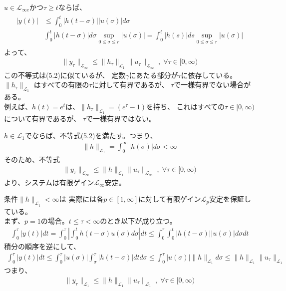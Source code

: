 \documentclass{jsarticle}
\begin{document}
$u\in \mathcal L_{\infty e}$かつ$\tau\geq t$ならば、
\begin{align}
  \begin{aligned}
    |y(t)| & \leq \int^t_0 |h(t-\sigma)||u(\sigma)|d\sigma\\
    & \int^t_0 |h(t-\sigma)|d\sigma \sup_{0\leq \sigma \leq r} |u(\sigma)| = \int^t_0 |h(s)|ds \sup_{0\leq \sigma \leq r} |u(\sigma)|
  \end{aligned}
\end{align}
よって、
\begin{align}
  \|y_\tau\|_{\mathcal L_\infty}\leq \|h_\tau\|_{\mathcal L_1}\|u_\tau\|_{\mathcal L_\infty}\;,\;\forall \tau \in [0,\infty)
\end{align}
この不等式は(5.2)に似ているが、
定数$\gamma$にあたる部分が$\tau$に依存している。\\
$\|h_\tau\|_{\mathcal L_1}$ はすべての有限の$\tau$に対して有界であるが、
$\tau$で一様有界でない場合がある。\\
例えば、$h(t)=e^t$は、$\|h_\tau\|_{\mathcal L_1}=(e^\tau -1)$を持ち、
これはすべての$\tau\in [0,\infty)$について有界であるが、
$\tau$で一様有界ではない。

$h\in \mathcal L_1$でならば、不等式(5.2)を満たす。つまり、
\begin{align}
  \|h\|_{\mathcal L_1} = \int^\infty_0 |h(\sigma)|d\sigma <\infty
\end{align}
そのため、不等式
\begin{align}
  \|y_\tau\|_{\mathcal L_\infty}\leq \|h\|_{\mathcal L_1}\|u_\tau\|_{\mathcal L_\infty}\;,\;\forall \tau \in [0,\infty)
\end{align}
より、システムは有限ゲイン$\mathcal L_\infty$安定。

条件$\|h\|_{\mathcal L_1}<\infty$は
実際には各$p\in [1,\infty]$に対して有限ゲイン$\mathcal L_p$安定を保証している。\\
まず、$p = 1$の場合。$t\leq \tau < \infty$のとき以下が成り立つ。
\begin{align}
  \int^\tau_0 |y(t)|dt = \int^\tau_0\left| \int^t_0 h(t-\sigma)u(\sigma) d\sigma \right| dt \leq \int^\tau_0 \int^t_0 |h(t-\sigma)||u(\sigma)|d\sigma dt
\end{align}
積分の順序を逆にして、
\begin{align}
  \int^\tau_0 |y(t)|dt \leq \int^\tau_0 |u(\sigma)|\int^\tau_\sigma |h(t-\sigma)|dt 
  d\sigma \leq \int^\tau_0 |u(\sigma)| \|h\|_{\mathcal L_1} d\sigma \leq \|h\|_{\mathcal L_1}\|u_\tau\|_{\mathcal L_1}
\end{align}
つまり、
\begin{align}
  \|y_\tau\|_{\mathcal L_1} \leq \|h\|_{\mathcal L_1}\|u_\tau\|_{\mathcal L_1}\;,\;\forall \tau\in [0,\infty)
\end{align}
\end{document}
